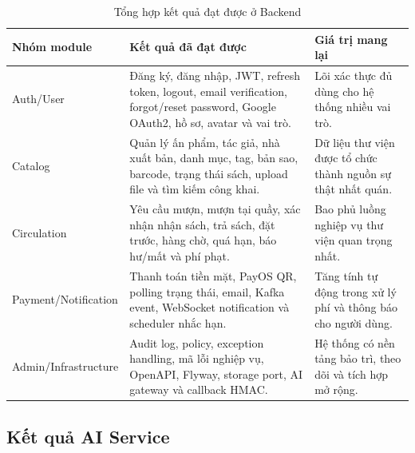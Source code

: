 \begin{table}[H]
\centering
\small
\begin{tabularx}{\textwidth}{|p{3.4cm}|X|p{3.5cm}|}
\hline
\textbf{Nhóm module} & \textbf{Kết quả đã đạt được} & \textbf{Giá trị mang lại} \\
\hline
Auth/User &
Đăng ký, đăng nhập, JWT, refresh token, logout, email verification, forgot/reset password, Google OAuth2, hồ sơ, avatar và vai trò. &
Lõi xác thực đủ dùng cho hệ thống nhiều vai trò. \\
\hline
Catalog &
Quản lý ấn phẩm, tác giả, nhà xuất bản, danh mục, tag, bản sao, barcode, trạng thái sách, upload file và tìm kiếm công khai. &
Dữ liệu thư viện được tổ chức thành nguồn sự thật nhất quán. \\
\hline
Circulation &
Yêu cầu mượn, mượn tại quầy, xác nhận nhận sách, trả sách, đặt trước, hàng chờ, quá hạn, báo hư/mất và phí phạt. &
Bao phủ luồng nghiệp vụ thư viện quan trọng nhất. \\
\hline
Payment/Notification &
Thanh toán tiền mặt, PayOS QR, polling trạng thái, email, Kafka event, WebSocket notification và scheduler nhắc hạn. &
Tăng tính tự động trong xử lý phí và thông báo cho người dùng. \\
\hline
Admin/Infrastructure &
Audit log, policy, exception handling, mã lỗi nghiệp vụ, OpenAPI, Flyway, storage port, AI gateway và callback HMAC. &
Hệ thống có nền tảng bảo trì, theo dõi và tích hợp mở rộng. \\
\hline
\end{tabularx}
\caption{Tổng hợp kết quả đạt được ở Backend}
\label{tab:conclusion_be_results}
\end{table}

\subsection{Kết quả AI Service}

